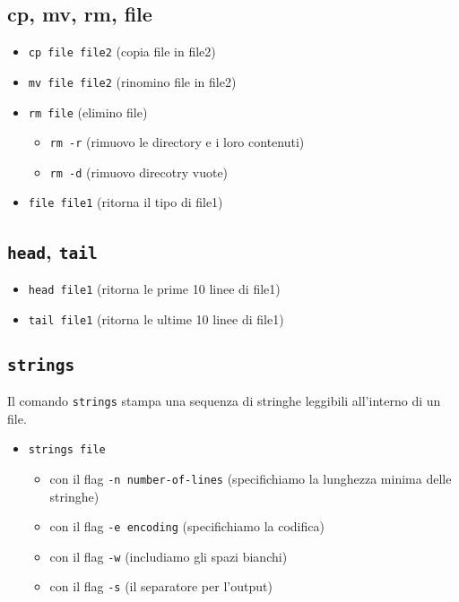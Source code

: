 \subsection{cp, mv, rm, file}
\begin{itemize}
    \item \texttt{cp file file2} (copia file in file2)
    \item \texttt{mv file file2} (rinomino file in file2)
    \item \texttt{rm file} (elimino file)
        \begin{itemize}
            \item \texttt{rm -r} (rimuovo le directory e i loro contenuti)
            \item \texttt{rm -d} (rimuovo direcotry vuote)
        \end{itemize}
    \item \texttt{file file1} (ritorna il tipo di file1)
\end{itemize}

\subsection{\texttt{head}, \texttt{tail}}
\begin{itemize}
    \item \texttt{head file1} (ritorna le prime 10 linee di file1)
    \item \texttt{tail file1} (ritorna le ultime 10 linee di file1)
\end{itemize}

\subsection{\texttt{strings}}
Il comando \texttt{strings} stampa una sequenza di stringhe leggibili all'interno di un file.
\begin{itemize}
    \item \texttt{strings file}
    \begin{itemize}
        \item con il flag \texttt{-n number-of-lines} (specifichiamo la lunghezza minima delle stringhe)
        \item con il flag \texttt{-e encoding} (specifichiamo la codifica)
        \item con il flag \texttt{-w} (includiamo gli spazi bianchi)
        \item con il flag \texttt{-s} (il separatore per l'output)
    \end{itemize}
\end{itemize}


